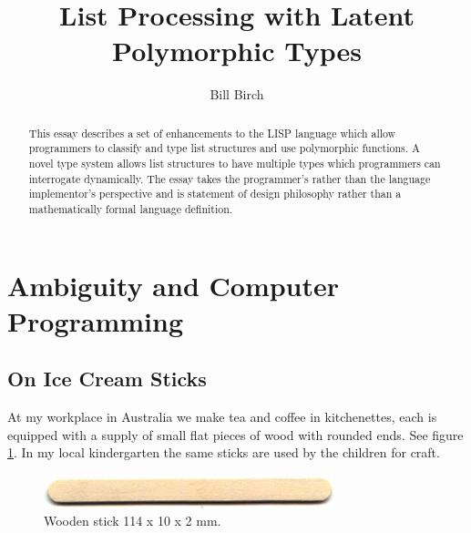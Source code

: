 \documentclass[a4paper,12pt,dvips]{article}
\begin{document}
\author{Bill Birch}
\title{List Processing with Latent Polymorphic Types}
\maketitle
\begin{abstract}
This essay describes a set of enhancements to the LISP language which allow programmers to classify and type list structures and use polymorphic functions. 
A novel type system  allows list structures to have multiple types which programmers can interrogate dynamically.  The essay takes the programmer's rather than the language implementor's perspective and is statement of design philosophy rather than a mathematically formal language definition.
\end{abstract}
\tableofcontents
\pagebreak\section{Ambiguity and Computer Programming}
\subsection{On Ice Cream Sticks}
At my workplace in Australia we make tea and coffee in kitchenettes, each is equipped with a supply of small flat pieces of wood with rounded ends. See figure \ref{fig:stick}.  In my local kindergarten the same sticks are used by the children for craft.
\begin{figure}[h]
\centering
\includegraphics[width=0.75\textwidth]{icecreamstick.jpg}
\caption{Wooden stick 114 x 10 x 2 mm.}
\label{fig:stick}
\end{figure}
\end{document}
